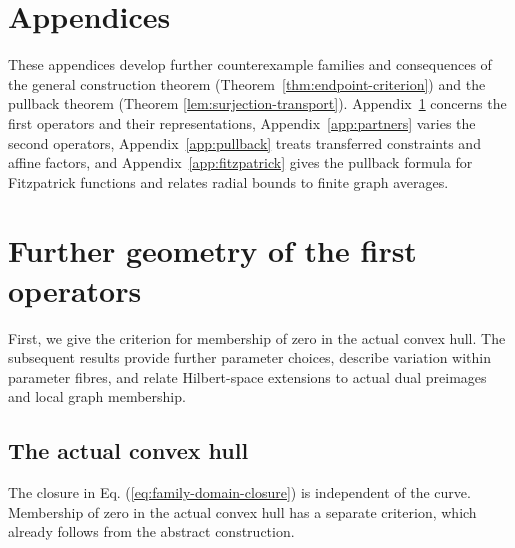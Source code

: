 \documentclass[11pt]{article}
\theoremstyle{definition}
\theoremstyle{remark}
\begin{document}

\appendix
{}

\section*{Appendices}
These appendices develop further counterexample families and consequences of the general construction theorem (Theorem~\ref{thm:endpoint-criterion}) and the pullback theorem (Theorem \ref{lem:surjection-transport}). Appendix~\ref{app:parameters} concerns the first operators and their representations, Appendix~\ref{app:partners} varies the second operators, Appendix~\ref{app:pullback} treats transferred constraints and affine factors, and Appendix~\ref{app:fitzpatrick} gives the pullback formula for Fitzpatrick functions and relates radial bounds to finite graph averages.

\section{Further geometry of the first operators}
\label{app:parameters}

First, we give the criterion for membership of zero in the actual convex hull. The subsequent results provide further parameter choices, describe variation within parameter fibres, and relate Hilbert-space extensions to actual dual preimages and local graph membership.

\subsection{The actual convex hull}
\label{subsec:appendix-convex-hull}

The closure in Eq. (\ref{eq:family-domain-closure}) is independent of the curve. Membership of zero in the actual convex hull has a separate criterion, which already follows from the abstract construction.
\end{document}
